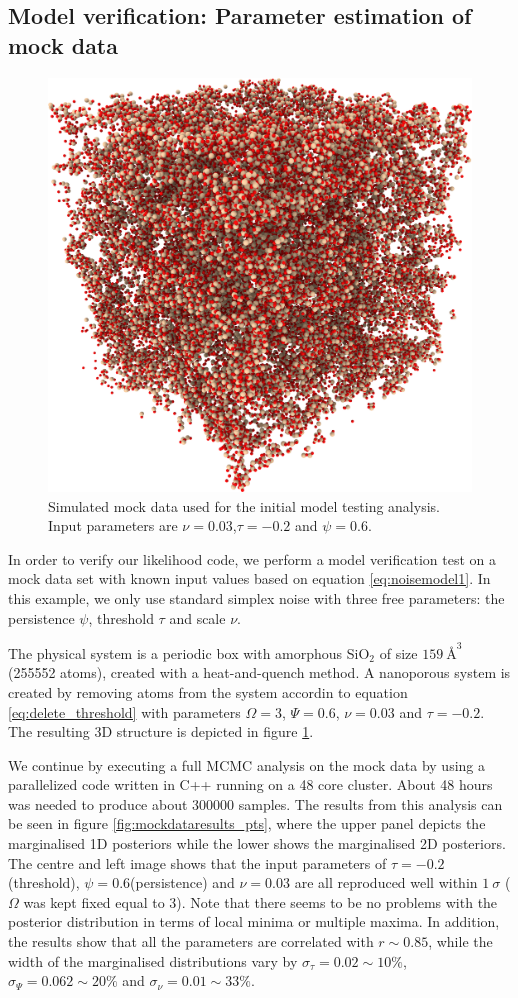 \documentclass[aps,pre,twocolumn,letterpaper,floatfix,showpacs]{revtex4}
\begin{document}
\subsection{Model verification: Parameter estimation of mock data}
\begin{figure}[htb!]
\includegraphics[width=.45\textwidth]{fig5.png}
\caption{Simulated mock data used for the initial model testing analysis. Input parameters are $\nu=0.03$,$\tau=-0.2$ and $\psi=0.6$.}
\label{fig:mockdata}
\end{figure}
In order to verify our likelihood code, we perform a model verification test
on a mock data set with known input values based on equation \ref{eq:noisemodel1}.
In this example, we only use standard simplex noise with three free parameters:
the persistence $\psi$, threshold $\tau$ and scale $\nu$. 

The physical system is a periodic box with amorphous SiO$_2$ of size $\SI{159} {\angstrom}^3$ (255552 atoms), created with a heat-and-quench method.
A nanoporous system is created by removing atoms from the system accordin to equation \eqref{eq:delete_threshold} with parameters $\Omega=3$, $\Psi = 0.6$, $\nu=0.03$ and $\tau=-0.2$.
The resulting 3D structure is depicted in figure \ref{fig:mockdata}. 

We continue by executing a full MCMC analysis on the mock data by using a
parallelized code written in C++ running on a 48 core cluster. About 48 hours
was needed to produce about 300000 samples. The results from this analysis
can be seen in figure \ref{fig:mockdataresults_pts}, where the upper panel
depicts the marginalised 1D posteriors while the lower shows the marginalised
2D posteriors. The centre and left image shows that the input parameters of
$\tau=-0.2$(threshold), $\psi=0.6$(persistence) and $\nu=0.03$ are all reproduced
well within $1 \ \sigma$ ($\Omega$ was kept fixed equal to 3). Note that there seems to be no problems with the posterior
distribution in terms of local minima or multiple maxima. In addition, the results
show that all the parameters are correlated with $r \sim 0.85$, while the width of
the marginalised distributions vary by $\sigma_\tau = 0.02 \sim 10\%$, $\sigma_\Psi = 0.062 \sim 20\%$ and $\sigma_\nu = 0.01 \sim 33\%$. 
\end{document}
